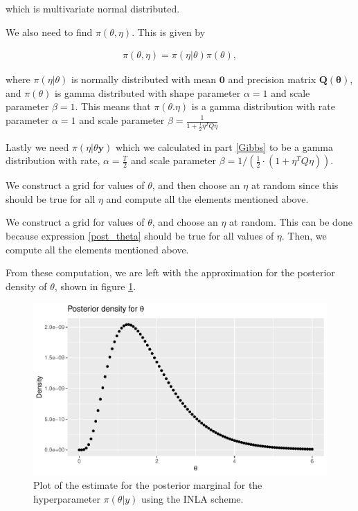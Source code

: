 which is multivariate normal distributed. 

We also need to find $\pi(\theta, \eta)$. This is given by 

\begin{align}
  \pi(\theta, \eta) = \pi(\eta|\theta)\pi(\theta), 
\end{align}

where $\pi(\eta|\theta)$ is normally distributed with mean $\mathbf{0}$ and precision matrix $\mathbf{Q(\theta)}$, and $\pi(\theta)$ is gamma distributed with shape parameter $\alpha = 1$ and scale parameter $\beta = 1$. This means that $\pi(\theta. \eta)$ is a gamma distribution with rate parameter $\alpha = 1$ and scale parameter $\beta = \frac{1}{1 + \frac{1}{2} \eta^{T} Q \eta}$

Lastly we need $\pi(\eta| \theta \boldsymbol{y})$ which we calculated in part \ref{Gibbs} to be a gamma distribution with rate, $\alpha = \frac{T}{2}$ and scale parameter $\beta = 1/(\frac{1}{2}\cdot (1 + \eta^T Q \eta))$.

We construct a grid for values of $\theta$, and then choose an $\eta$ at random since this should be true for all $\eta$ and compute all the elements mentioned above.  

We construct a grid for values of $\theta$, and choose an $\eta$ at random. This can be done because expression \ref{post_theta} should be true for all values of $\eta$. Then, we compute all the elements mentioned above.  





From these computation, we are left with the approximation for the posterior density of $\theta$, shown in figure \ref{fig:post_theta_inla}. 
\begin{figure}[h!]
    \centering
    \includegraphics[width=\textwidth]{Images/post_theta_inla.pdf}
    \caption{Plot of the estimate for the posterior marginal for the hyperparameter $\pi(\theta|y)$ using the INLA scheme.}
    \label{fig:post_theta_inla}
\end{figure}

